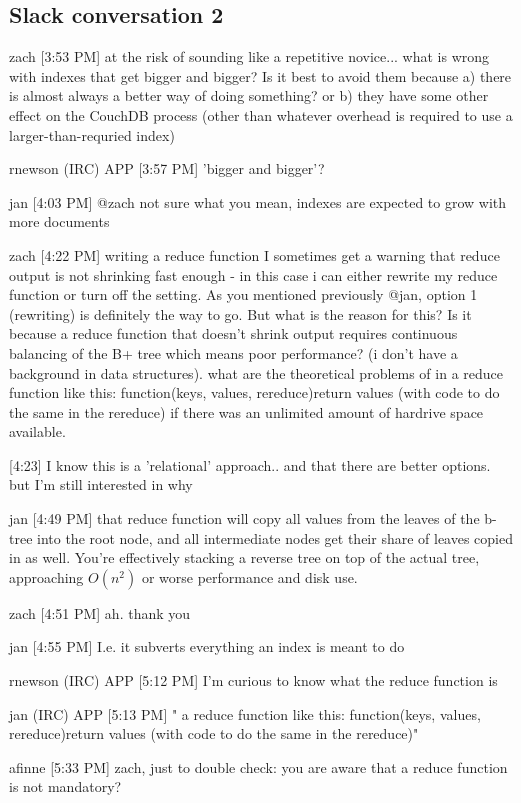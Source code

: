 \subsection{Slack conversation 2}
\label{appendix:slack2}
zach [3:53 PM]
at the risk of sounding like a repetitive novice... what is wrong with indexes that get bigger and bigger? Is it best to avoid them because a) there is almost always a better way of doing something? or b) they have some other effect on the CouchDB process (other than whatever overhead is required to use a larger-than-requried index)

rnewson (IRC) APP [3:57 PM]
'bigger and bigger'?

jan [4:03 PM]
@zach not sure what you mean, indexes are expected to grow with more documents

zach [4:22 PM]
writing a reduce function I sometimes get a warning that reduce output is not shrinking fast enough - in this case i can either rewrite my reduce function or turn off the setting. As you mentioned previously @jan, option 1 (rewriting) is definitely the way to go. But what is the reason for this? Is it because a reduce function that doesn't shrink output requires continuous balancing of the B+ tree which means poor performance? (i don't have a background in data structures). what are the theoretical problems of in a reduce function like this: function(keys, values, rereduce){return values (with code to do the same in the rereduce)} if there was an unlimited amount of hardrive space available.

[4:23]
I know this is a 'relational' approach.. and that there are better options. but I'm still interested in why

jan [4:49 PM]
that reduce function will copy all values from the leaves of the b-tree into the root node, and all intermediate nodes get their share of leaves copied in as well. You’re effectively stacking a reverse tree on top of the actual tree, approaching $ O(n^2) $ or worse performance and disk use.

zach [4:51 PM]
ah. thank you

jan [4:55 PM]
I.e. it subverts everything an index is meant to do

rnewson (IRC) APP [5:12 PM]
I'm curious to know what the reduce function is

jan (IRC) APP [5:13 PM]
" a reduce function like this: function(keys, values, rereduce){return values (with code to do the same in the rereduce)}"

afinne [5:33 PM]
zach, just to double check: you are aware that a reduce function is not mandatory?

